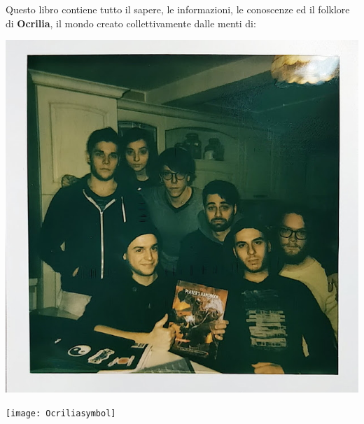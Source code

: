 \documentclass[10pt,twoside,onecolumn,openany]{book}
\begin{document}
\begin{large}
Questo libro contiene tutto il sapere, le informazioni, le conoscenze ed il folklore di \textbf{Ocrilia}, il mondo creato collettivamente dalle menti di:
\begin{center}
\includegraphics[scale=0.33]{party}
\end{center}
\end{large}
\begin{center}
\texttt{[image: Ocriliasymbol]}
\end{center}
\end{document}
